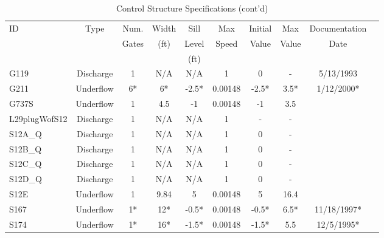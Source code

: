 \scriptsize
\begin{table}[h]
\caption{Control Structure Specifications (cont'd)}
\label{tab:struc-specs2}
\begin{tabular}{@{}lccccccccc@{}}
\toprule
{ID}            & {Type}        & Num.     & Width       & Sill         & Max         & Initial         & Max     & Documentation  \\
                &               & Gates    & (ft)        & Level        & Speed       & Value           & Value   & Date           \\
                &               &          &             & (ft)         &             &                 &         &                \\
\hline
{G119}          & Discharge     & 1        & N/A         & N/A          & 1           & 0               & -       & 5/13/1993      \\
{G211}          & Underflow     & 6*       & 6*          & -2.5*        & 0.00148     & -2.5*           & 3.5*    & 1/12/2000*      \\
{G737S}         & Underflow     & 1        & 4.5         & -1           & 0.00148     & -1              & 3.5     &                 \\
{L29plugWofS12} & Discharge     & 1        & N/A         & N/A          & 1           & -               & -       &                 \\
{S12A\_Q}       & Discharge     & 1        & N/A         & N/A          & 1           & 0               & -       &                 \\
{S12B\_Q}       & Discharge     & 1        & N/A         & N/A          & 1           & 0               & -       &                 \\
{S12C\_Q}       & Discharge     & 1        & N/A         & N/A          & 1           & 0               & -       &                 \\
{S12D\_Q}       & Discharge     & 1        & N/A         & N/A          & 1           & 0               & -       &                 \\
{S12E}          & Underflow     & 1        & 9.84        & 5            & 0.00148     & 5               & 16.4    &                 \\
{S167}          & Underflow     & 1*       & 12*         & -0.5*        & 0.00148     & -0.5*           & 6.5*    & 11/18/1997*      \\
{S174}          & Underflow     & 1*       & 16*         & -1.5*        & 0.00148     & -1.5*           & 5.5     & 12/5/1995*      \\

\end{tabular}
\end{table}
